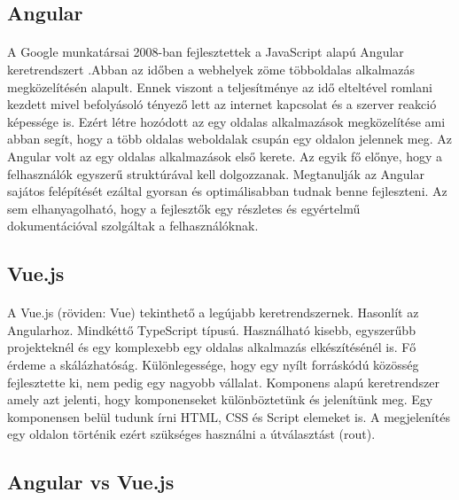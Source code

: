 	\subsection{Angular}
	\paragraph{}
	A Google munkatársai 2008-ban fejlesztettek a JavaScript alapú Angular keretrendszert \cite{wohlgethan2018supportingweb}.Abban az időben a webhelyek zöme többoldalas alkalmazás megközelítésén alapult. Ennek viszont a teljesítménye az idő elteltével romlani kezdett mivel befolyásoló tényező lett az internet kapcsolat és a szerver reakció képessége is. Ezért létre hozódott az egy oldalas alkalmazások megközelítése ami abban segít, hogy a több oldalas weboldalak csupán egy oldalon jelennek meg. Az Angular volt az egy oldalas alkalmazások első kerete. Az egyik fő előnye, hogy a felhasználók egyszerű struktúrával kell dolgozzanak. Megtanulják az Angular sajátos felépítését ezáltal gyorsan és optimálisabban tudnak benne fejleszteni. Az sem elhanyagolható, hogy a fejlesztők egy részletes és egyértelmű dokumentációval szolgáltak a felhasználóknak.
	
	\subsection{Vue.js}
	\paragraph{}
	A Vue.js (röviden: Vue) \cite{wohlgethan2018supportingweb} tekinthető a legújabb keretrendszernek. Hasonlít az Angularhoz. Mindkéttő TypeScript típusú. Használható kisebb, egyszerűbb projekteknél és egy komplexebb egy oldalas alkalmazás elkészítésénél is. Fő érdeme a skálázhatóság. Különlegessége, hogy egy nyílt forráskódú közösség fejlesztette ki, nem pedig egy nagyobb vállalat. Komponens alapú keretrendszer amely azt jelenti, hogy komponenseket különböztetünk és jelenítünk meg. Egy komponensen belül tudunk írni HTML, CSS és Script elemeket is. A megjelenítés egy oldalon történik ezért szükséges használni a útválasztást (rout).
	
	\subsection{Angular vs Vue.js}
